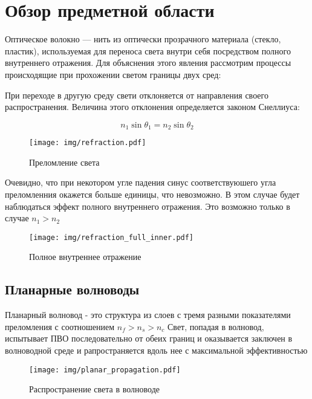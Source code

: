 \chapter{Обзор предметной области}
Оптическое волокно — нить из оптически прозрачного материала (стекло, пластик), используемая для переноса света внутри себя посредством полного внутреннего отражения. Для объяснения этого явления рассмотрим процессы происходящие при прохожении светом границы двух сред:

При переходе в другую среду свети отклоняется от направления своего распространения. Величина этого отклонения определяется законом Снеллиуса:

\begin{equation}
 n_1 \sin\theta_1 = n_2 \sin\theta_2
\end{equation}

\begin{figure}[h!]
\texttt{[image: img/refraction.pdf]}
\caption{Преломление света}
\end{figure}

Очевидно, что при некотором угле падения синус соответствуюшего угла преломленния окажется больше единицы, что невозможно. В этом случае будет наблюдаться эффект полного внутреннего отражения. Это возможно только в случае $n_1 > n_2$

\begin{figure}[h!]
\texttt{[image: img/refraction\_full\_inner.pdf]}
\caption{Полное внутреннее отражение}
\end{figure}

\section{Планарные волноводы}
Планарный волновод - это структура из слоев с тремя разными показателями преломления с соотношением $n_f > n_s > n_c$ Свет, попадая в волновод, испытывает ПВО последовательно от обеих границ и оказывается заключен в волноводной среде и рапространяется вдоль нее с максимальной эффективностью

\begin{figure}[h!]
\texttt{[image: img/planar\_propagation.pdf]}
\caption{Распространение света в волноводе}
\end{figure}

